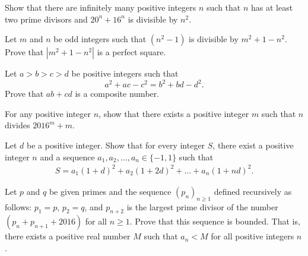\documentclass[problems.tex]{subfile}
\begin{document}
	
	
	\begin{problem}
		Show that there are infinitely many positive integers $n$ such that $n$ has at least two prime divisors and $20^n + 16^n$ is divisible by $n^2$.
	\end{problem}
	
	
	
	\begin{problem}
		Let $m$ and $n$ be odd integers such that $(n^2 - 1)$ is divisible by $m^2 + 1 - n^2$. Prove that $|m^2 + 1 - n^2|$ is a perfect square.
	\end{problem}
	
	
	
	
	\begin{problem}
		Let $a > b > c > d$ be positive integers such that $$a^2 + ac - c^2 = b^2 + bd - d^2.$$ Prove that $ab + cd$ is a composite number.
	\end{problem}
	
	
	\begin{problem}
		For any positive integer $n$, show that there exists a positive integer $m$ such that $n$ divides $2016^m + m$.
	\end{problem}
	
	
	\begin{problem}
		Let $d$ be a positive integer. Show that for every integer $S$, there exist a positive integer $n$ and a sequence $a_1, a_2,\dots , a_n \in \{-1, 1\}$ such that
		\begin{align*}
			S = a_1(1 + d)^2 + a_2(1 + 2d)^2 + \dots + a_n(1 + nd)^2.
		\end{align*}
	\end{problem}
	
	
	\begin{problem}
		Let $p$ and $q$ be given primes and the sequence $(p_n)_{n\geq 1}$ defined recursively as follows: $p_1 = p$, $p_2 = q$, and $p_{n+2}$ is the largest prime divisor of the number $(p_n + p_{n+1} + 2016)$ for all $n \geq 1$. Prove that this sequence is bounded. That is, there exists a positive real number $M$ such that $a_n < M$ for all positive integers $n$.
	\end{problem}
	
\end{document}
